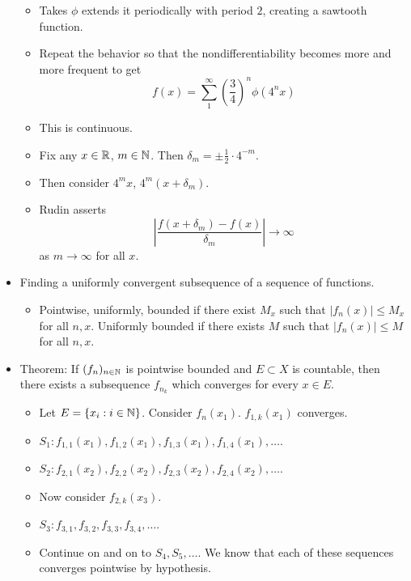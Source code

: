 \documentclass[../../notes.tex]{subfiles}
\begin{document}
\begin{itemize}
\begin{itemize}
        \item Takes $\phi$ extends it periodically with period $2$, creating a sawtooth function.
        \item Repeat the behavior so that the nondifferentiability becomes more and more frequent to get
        \begin{equation*}
            f(x) = \sum_1^\infty\left( \frac{3}{4} \right)^n\phi(4^nx)
        \end{equation*}
        \item This is continuous.
        \item Fix any $x\in\mathbb{R}$, $m\in\mathbb{N}$. Then $\delta_m=\pm\frac{1}{2}\cdot 4^{-m}$.
        \item Then consider $4^mx$, $4^m(x+\delta_m)$.
        \item Rudin asserts
        \begin{equation*}
            \left| \frac{f(x+\delta_m)-f(x)}{\delta_m} \right| \to\infty
        \end{equation*}
        as $m\to\infty$ for all $x$.
    \end{itemize}
    \item {}Finding a uniformly convergent subsequence of a sequence of functions.
    \begin{itemize}
        \item Pointwise, uniformly, bounded if there exist $M_x$ such that $|f_n(x)|\leq M_x$ for all $n,x$. Uniformly bounded if there exists $M$ such that $|f_n(x)|\leq M$ for all $n,x$.
    \end{itemize}
    \item Theorem: If $(f_n)_{n\in\mathbb{N}}$ is pointwise bounded and $E\subset X$ is countable, then there exists a subsequence $f_{n_k}$ which converges for every $x\in E$.
    \begin{itemize}
        \item Let $E=\{x_i:i\in\mathbb{N}\}$. Consider $f_n(x_1)$. $f_{1,k}(x_1)$ converges.
        \item $S_1:f_{1,1}(x_1),f_{1,2}(x_1),f_{1,3}(x_1),f_{1,4}(x_1),\dots$.
        \item $S_2:f_{2,1}(x_2),f_{2,2}(x_2),f_{2,3}(x_2),f_{2,4}(x_2),\dots$.
        \item Now consider $f_{2,k}(x_3)$.
        \item $S_3:f_{3,1},f_{3,2},f_{3,3},f_{3,4},\dots$.
        \item Continue on and on to $S_4,S_5,\dots$. We know that each of these sequences converges pointwise by hypothesis.

\end{itemize}
\end{itemize}
\end{document}
